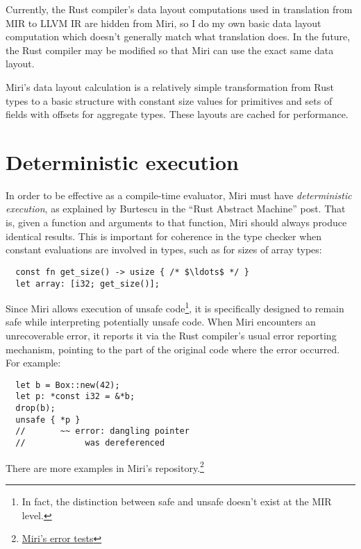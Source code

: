 \documentclass[twocolumn]{article}
\begin{document}
Currently, the Rust compiler's data layout computations used in translation from MIR to LLVM IR are
hidden from Miri, so I do my own basic data layout computation which doesn't generally match what
translation does. In the future, the Rust compiler may be modified so that Miri can use the exact
same data layout.

Miri's data layout calculation is a relatively simple transformation from Rust types to a basic
structure with constant size values for primitives and sets of fields with offsets for aggregate
types. These layouts are cached for performance.


\section{Deterministic execution}
\label{sec:deterministic}

In order to be effective as a compile-time evaluator, Miri must have \emph{deterministic execution},
as explained by Burtescu in the ``Rust Abstract Machine'' post. That is, given a function and
arguments to that function, Miri should always produce identical results. This is important for
coherence in the type checker when constant evaluations are involved in types, such as for sizes of
array types:

\begin{verbatim}
  const fn get_size() -> usize { /* $\ldots$ */ }
  let array: [i32; get_size()];
\end{verbatim}

Since Miri allows execution of unsafe code\footnote{In fact, the distinction between safe and unsafe
doesn't exist at the MIR level.}, it is specifically designed to remain safe while interpreting
potentially unsafe code. When Miri encounters an unrecoverable error, it reports it via the Rust
compiler's usual error reporting mechanism, pointing to the part of the original code where the
error occurred. For example:

\begin{verbatim}
  let b = Box::new(42);
  let p: *const i32 = &*b;
  drop(b);
  unsafe { *p }
  //       ~~ error: dangling pointer
  //            was dereferenced
\end{verbatim}
\label{dangling-pointer}

There are more examples in Miri's
repository.\footnote{\href{https://github.com/tsion/miri/blob/master/test/errors.rs}{Miri's error
tests}}
\end{document}
